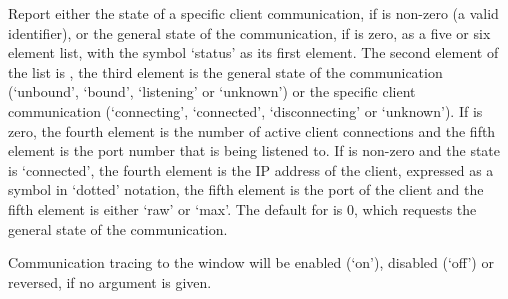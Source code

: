   Report either the state of a specific client communication, if  is non-zero
  (a valid identifier), or the general state of the communication, if  is zero,
  as a five or six element list, with the symbol `status' as its first element.
  The second element of the list is , the third element is the general state of
  the communication (`unbound', `bound', `listening' or `unknown') or the specific client
  communication (`connecting', `connected', `disconnecting' or `unknown').
  If  is zero, the fourth element is the number of active client connections and
  the fifth element is the port number that is being listened to.
  If  is non-zero and the state is `connected', the fourth element is the IP
  address of the client, expressed as a symbol in `dotted' notation, the fifth element is the
  port of the client and the fifth element is either `raw' or `max'.
  The default for  is 0, which requests the general state of the communication.

  Communication tracing to the \MaxName{} window will be enabled (`on'), disabled (`off') or
  reversed, if no argument is given.
  
  \objListCmdEnd

\objItemFile



